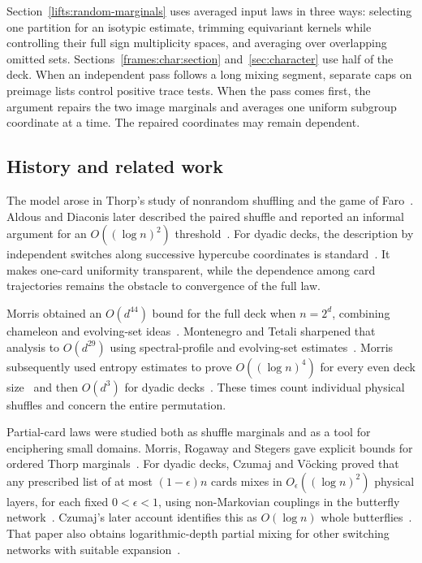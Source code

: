 Section~\ref{lifts:random-marginals} uses averaged input laws in three ways: selecting one partition
for an isotypic estimate, trimming equivariant kernels while controlling
their full sign multiplicity spaces, and averaging over overlapping
omitted sets. Sections~\ref{frames:char:section} and~\ref{sec:character}
use half of the deck. When
an independent pass follows a long mixing segment, separate caps on
preimage lists control positive trace tests. When the pass comes first,
the argument repairs the two image marginals and averages one uniform
subgroup coordinate at a time. The repaired coordinates may remain
dependent.

\subsection{History and related work}

The model arose in Thorp's study of nonrandom shuffling and the game
of Faro~\cite{thorp}. Aldous and Diaconis later described the paired
shuffle and reported an informal argument for an
$O((\log n)^2)$ threshold~\cite[Section~8b, Example~(12)]{aldous-diaconis1987}.
For dyadic decks, the description by independent switches along
successive hypercube coordinates is standard~\cite{morris44}. It makes
one-card uniformity transparent, while the dependence among card
trajectories remains the obstacle to convergence of the full law.

Morris obtained an $O(d^{44})$ bound for the full deck when $n=2^d$,
combining chameleon and evolving-set ideas~\cite{morris44}. Montenegro
and Tetali sharpened that analysis to $O(d^{29})$ using spectral-profile
and evolving-set estimates~\cite[Theorems~6.14--6.15]{montenegro-tetali2006}.
Morris subsequently used entropy estimates to prove
$O((\log n)^4)$ for every even deck size~\cite{morris4} and then
$O(d^3)$ for dyadic decks~\cite{morris3}. These times count individual
physical shuffles and concern the entire permutation.

Partial-card laws were studied both as shuffle marginals and as a tool
for enciphering small domains. Morris, Rogaway and Stegers gave explicit
bounds for ordered Thorp marginals~\cite[Theorem~1]{mrs}. For dyadic
decks, Czumaj and V\"ocking proved that any prescribed list of at most
$(1-\epsilon)n$ cards mixes in $O_\epsilon((\log n)^2)$ physical layers,
for each fixed $0<\epsilon<1$, using non-Markovian couplings in the
butterfly network~\cite{CzumajVocking2014}. Czumaj's later account
identifies this as $O(\log n)$ whole butterflies~\cite[Section~1.5]{Czumaj2015}.
That paper also obtains logarithmic-depth partial mixing for other
switching networks with suitable expansion~\cite[Theorems~3.4--3.6]{Czumaj2015}.

